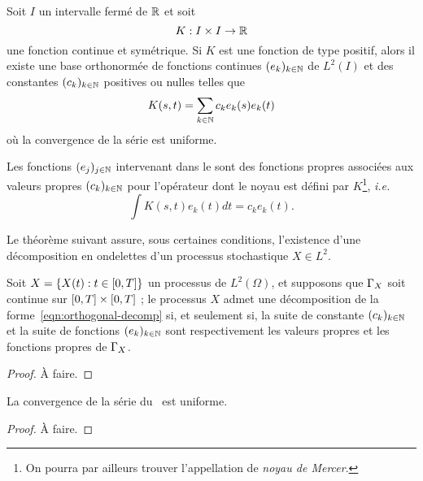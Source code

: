\begin{theorem}
  \label{thm:mercers-theorem}
  Soit $I$ un intervalle fermé de $\mathbb{R}$ et soit
  \[ K : I\times I\to \mathbb{R} \] une fonction continue et symétrique. Si
  $K$ est une fonction de type positif, alors il existe une base
  orthonormée de fonctions continues $(e_k)_{k\in\mathbb{N}}$ de $L^2(I)$ et
  des constantes $(c_k)_{k\in\mathbb{N}}$ positives ou nulles telles que
  \begin{equation}
    K(s,t) = \sum_{k\in\mathbb{N}} c_k e_k(s) e_k(t)
  \end{equation}
  où la convergence de la série est uniforme.
\end{theorem}

\begin{remarque}
  Les fonctions $(e_j)_{j\in\mathbb{N}}$ intervenant dans le
   sont des \og fonctions propres\fg{}
  associées aux \og valeurs propres\fg{} $(c_k)_{k\in\mathbb{N}}$ pour
  l'opérateur dont le noyau est défini par $K$\footnote{On pourra par
    ailleurs trouver l'appellation de \emph{noyau de Mercer}.},
  \emph{i.e.}
  \begin{equation*}
    \int K(s,t) e_k(t) dt = c_k e_k(t).
  \end{equation*}
\end{remarque}

Le théorème suivant assure, sous certaines conditions, l'existence
d'une \og décomposition en ondelettes\fg{} d'un processus stochastique
$X\in L^2$.

\begin{theoreme}
  \label{thm:orthogonal-decomp}
  Soit $X = \{X(t) : t\in\left[0,T\right]\}$ un processus de $L^2(\Omega)$,
  et supposons que $\Gamma_X$ soit continue sur
  $\left[0,T\right]\times\left[0,T\right]$ ; le processus $X$ admet une
  décomposition de la forme~\ref{eqn:orthogonal-decomp} si, et
  seulement si, la suite de constante $(c_k)_{k\in\mathbb{N}}$ et la suite de
  fonctions $(e_k)_{k\in\mathbb{N}}$ sont respectivement les valeurs propres
  et les fonctions propres de $\Gamma_X$.
\end{theoreme}
\begin{alert}
  \begin{proof}
    À faire.
  \end{proof}
\end{alert}

\begin{remarque}
  La convergence de la série du~ est uniforme.
\end{remarque}
\begin{alert}
  \begin{proof}
    À faire.
  \end{proof}
\end{alert}

